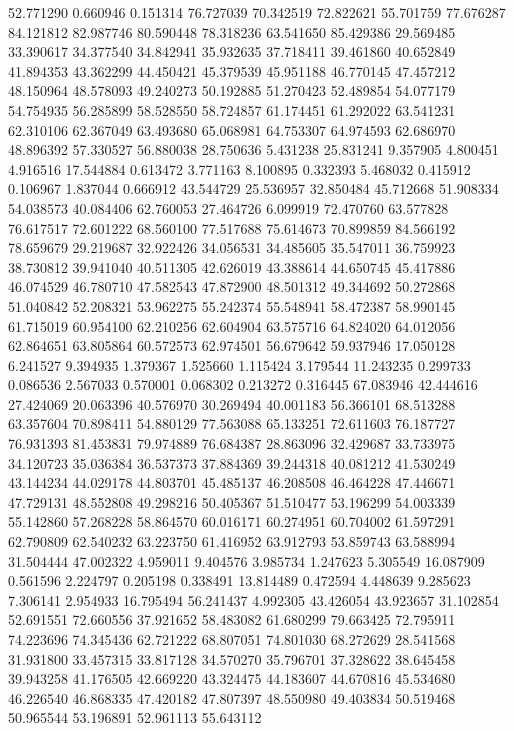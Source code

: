 52.771290
0.660946
0.151314
76.727039
70.342519
72.822621
55.701759
77.676287
84.121812
82.987746
80.590448
78.318236
63.541650
85.429386
29.569485
33.390617
34.377540
34.842941
35.932635
37.718411
39.461860
40.652849
41.894353
43.362299
44.450421
45.379539
45.951188
46.770145
47.457212
48.150964
48.578093
49.240273
50.192885
51.270423
52.489854
54.077179
54.754935
56.285899
58.528550
58.724857
61.174451
61.292022
63.541231
62.310106
62.367049
63.493680
65.068981
64.753307
64.974593
62.686970
48.896392
57.330527
56.880038
28.750636
5.431238
25.831241
9.357905
4.800451
4.916516
17.544884
0.613472
3.771163
8.100895
0.332393
5.468032
0.415912
0.106967
1.837044
0.666912
43.544729
25.536957
32.850484
45.712668
51.908334
54.038573
40.084406
62.760053
27.464726
6.099919
72.470760
63.577828
76.617517
72.601222
68.560100
77.517688
75.614673
70.899859
84.566192
78.659679
29.219687
32.922426
34.056531
34.485605
35.547011
36.759923
38.730812
39.941040
40.511305
42.626019
43.388614
44.650745
45.417886
46.074529
46.780710
47.582543
47.872900
48.501312
49.344692
50.272868
51.040842
52.208321
53.962275
55.242374
55.548941
58.472387
58.990145
61.715019
60.954100
62.210256
62.604904
63.575716
64.824020
64.012056
62.864651
63.805864
60.572573
62.974501
56.679642
59.937946
17.050128
6.241527
9.394935
1.379367
1.525660
1.115424
3.179544
11.243235
0.299733
0.086536
2.567033
0.570001
0.068302
0.213272
0.316445
67.083946
42.444616
27.424069
20.063396
40.576970
30.269494
40.001183
56.366101
68.513288
63.357604
70.898411
54.880129
77.563088
65.133251
72.611603
76.187727
76.931393
81.453831
79.974889
76.684387
28.863096
32.429687
33.733975
34.120723
35.036384
36.537373
37.884369
39.244318
40.081212
41.530249
43.144234
44.029178
44.803701
45.485137
46.208508
46.464228
47.446671
47.729131
48.552808
49.298216
50.405367
51.510477
53.196299
54.003339
55.142860
57.268228
58.864570
60.016171
60.274951
60.704002
61.597291
62.790809
62.540232
63.223750
61.416952
63.912793
53.859743
63.588994
31.504444
47.002322
4.959011
9.404576
3.985734
1.247623
5.305549
16.087909
0.561596
2.224797
0.205198
0.338491
13.814489
0.472594
4.448639
9.285623
7.306141
2.954933
16.795494
56.241437
4.992305
43.426054
43.923657
31.102854
52.691551
72.660556
37.921652
58.483082
61.680299
79.663425
72.795911
74.223696
74.345436
62.721222
68.807051
74.801030
68.272629
28.541568
31.931800
33.457315
33.817128
34.570270
35.796701
37.328622
38.645458
39.943258
41.176505
42.669220
43.324475
44.183607
44.670816
45.534680
46.226540
46.868335
47.420182
47.807397
48.550980
49.403834
50.519468
50.965544
53.196891
52.961113
55.643112
